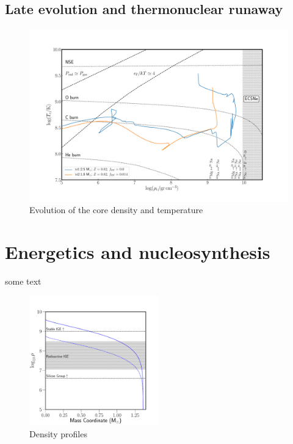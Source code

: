 \documentclass[twocolumn,tighten,times]{aastex62}
\begin{document}
\subsection{Late evolution and thermonuclear runaway}
\begin{figure}[htb!]
\begin{center}
\includegraphics[width=1.0\textwidth]{Rhoc_vs_Tc.pdf}
\caption{Evolution of the core density and temperature }
\label{fig:2}
\end{center}
\end{figure}



\section{Energetics and nucleosynthesis}\label{sec:3}
some text
\begin{figure}[htb!]
\begin{center}
\includegraphics[width=0.5\textwidth]{nucleosynthesis.pdf}
\caption{Density profiles}
\label{fig:nuc}
\end{center}
\end{figure}
\end{document}
